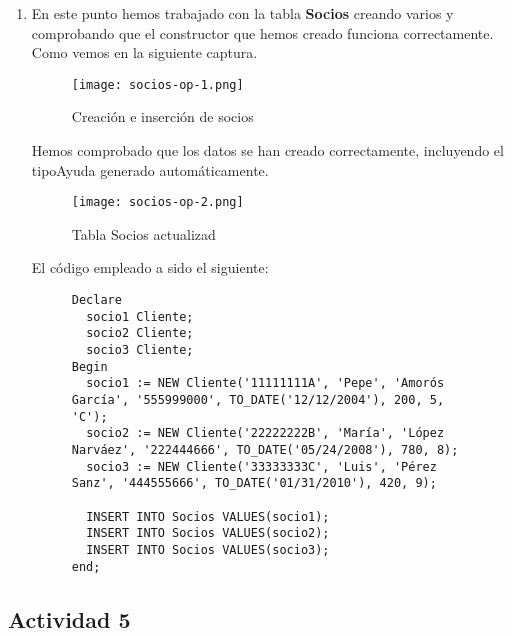 \begin{enumerate}[label=\alph*)]
    \item En este punto hemos trabajado con la tabla \textbf{Socios} creando varios y comprobando que el constructor que hemos creado funciona correctamente. Como vemos en la siguiente captura.

    \begin{figure}[H]
        \centering
        \texttt{[image: socios-op-1.png]}
        \caption{Creación e inserción de socios}
    \end{figure}

    Hemos comprobado que los datos se han creado correctamente, incluyendo el tipoAyuda generado automáticamente.

    \begin{figure}[H]
        \centering
        \texttt{[image: socios-op-2.png]}
        \caption{Tabla Socios actualizad}
    \end{figure}

    El código empleado a sido el siguiente:

    \begin{figure}[H]
        \begin{tcolorbox}[sharp corners, colback=yellow!30, colframe=white!20]
            \tiny
            \begin{verbatim}
Declare
  socio1 Cliente;
  socio2 Cliente;
  socio3 Cliente;
Begin
  socio1 := NEW Cliente('11111111A', 'Pepe', 'Amorós García', '555999000', TO_DATE('12/12/2004'), 200, 5, 'C');
  socio2 := NEW Cliente('22222222B', 'María', 'López Narváez', '222444666', TO_DATE('05/24/2008'), 780, 8);
  socio3 := NEW Cliente('33333333C', 'Luis', 'Pérez Sanz', '444555666', TO_DATE('01/31/2010'), 420, 9);

  INSERT INTO Socios VALUES(socio1);
  INSERT INTO Socios VALUES(socio2);
  INSERT INTO Socios VALUES(socio3);
end;
            \end{verbatim}
        \end{tcolorbox}
    \end{figure}
\end{enumerate}

\subsection{Actividad 5}
